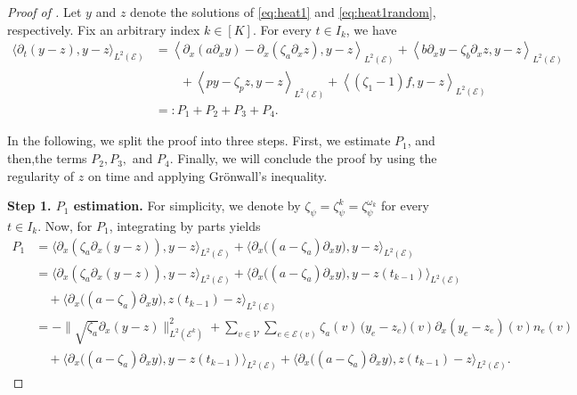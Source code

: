 \documentclass[a4paper, 10pt, english]{article}
\begin{document}
\begin{proof}[Proof of  ]
    Let $y$ and $z$ denote the solutions of \eqref{eq:heat1} and \eqref{eq:heat1random}, respectively. Fix an arbitrary index $k \in [K]$. For every $t \in I_k$, we have
    \begin{align}\label{eq:ineq1}
      \langle \partial_t (y - z), y - z \rangle_{L^2(\mathcal{E})}
      &= \left\langle
           \partial_x(a\partial_x y)
           - \partial_x(\zeta_a\partial_x z),
           y - z
         \right\rangle_{L^2(\mathcal{E})} +
         \left\langle
           b\partial_x y
           - \zeta_b \partial_x z,
           y - z
         \right\rangle_{L^2(\mathcal{E})}\\
         &\qquad+
         \left\langle
           py
           - \zeta_pz,
           y - z
         \right\rangle_{L^2(\mathcal{E})}
         +
         \left\langle
           (\zeta_1 - 1) f,
           y - z
         \right\rangle_{L^2(\mathcal{E})}
      \nonumber \\
      &=: P_1 + P_2 + P_3 + P_4.
    \end{align}

    In the following, we split the proof into three steps. First, we estimate $P_1$, and then,the terms $P_2, P_3,$ and $P_4$. Finally, we will conclude the proof by using the regularity of $z$ on time and applying Gr\"onwall's inequality. 
\smallbreak
    
    \noindent
    {\bf Step 1. $P_1$ estimation. } For simplicity, we denote by $\zeta_\psi = \zeta_\psi^k = \zeta^{\omega_k}_\psi$ for every $t\in I_k$. Now, for $P_1$, integrating by parts yields
    \begin{align*}
      P_1 
      &= 
      \big\langle 
        \partial_x(\zeta_a\partial_x(y - z)), 
        y - z
      \big\rangle_{L^2(\mathcal{E})}
      +
      \big\langle
        \partial_x\bigl((a - \zeta_a)\partial_x y\bigr),
        y - z
      \big\rangle_{L^2(\mathcal{E})}
      \nonumber \\
      &=
      \big\langle 
        \partial_x(\zeta_a\partial_x(y - z)), 
        y - z
      \big\rangle_{L^2(\mathcal{E})}
      +
      \big\langle
        \partial_x\bigl((a - \zeta_a)\partial_x y\bigr),
        y - z(t_{k-1})
      \big\rangle_{L^2(\mathcal{E})}
      \nonumber \\
      &\quad
      +
      \big\langle
        \partial_x\bigl((a - \zeta_a)\partial_x y\bigr),
        z(t_{k-1}) - z
      \big\rangle_{L^2(\mathcal{E})}
      \nonumber \\
      &=
      -\bigl\|\sqrt{\zeta_a}\partial_x(y - z)\bigr\|_{L^2(\mathcal{E}^k)}^2
      +
      \sum_{v \in \mathcal{V}}
      \sum_{e \in \mathcal{E}(v)}
         \zeta_a(v)\,\bigl(y_e - z_e\bigr)(v)\partial_x(y_e - z_e)(v)n_e(v)
      \nonumber \\
      &\quad
      +
      \big\langle
        \partial_x\bigl((a - \zeta_a)\partial_x y\bigr),
        y - z(t_{k-1})
      \big\rangle_{L^2(\mathcal{E})}
      +
      \big\langle
        \partial_x\bigl((a - \zeta_a)\partial_x y\bigr),
        z(t_{k-1}) - z
      \big\rangle_{L^2(\mathcal{E})}.
    \end{align*}


\end{proof}
\end{document}
